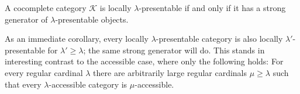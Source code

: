 \begin{Lemma}\label{lemma:stronggen}
A cocomplete category $\mathcal K$ is locally $\lambda$-presentable if and only if it has a strong generator of $\lambda$-presentable objects. \cite[Theorem 1.20]{AdamekRosicky}
\end{Lemma}

As an immediate corollary, every locally $\lambda$-presentable category is also locally $\lambda'$-presentable for $\lambda' \geq \lambda$; the same strong generator will do. This stands in interesting contrast to the accessible case, where only the following holds: For every regular cardinal $\lambda$ there are arbitrarily large regular cardinals $\mu \geq \lambda$ such that every $\lambda$-accessible category is $\mu$-accessible. \cite[Theorem 2.14]{AdamekRosicky} \\

